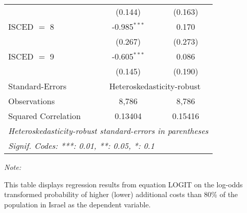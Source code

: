 \begin{table}[htbp!]
\begin{adjustbox}{width = 1\textwidth, max height = 0.95\textheight, center}
\begin{threeparttable}[b]
\begin{tabular}{lcc}
                                 & (0.144)        & (0.163)\\   
            ISCED $=$ 8          & -0.985$^{***}$ & 0.170\\   
                                 & (0.267)        & (0.273)\\   
            ISCED $=$ 9          & -0.605$^{***}$ & 0.086\\   
                                 & (0.145)        & (0.190)\\   
            \midrule 
            Standard-Errors & \multicolumn{2}{c}{Heteroskedasticity-robust} \\ 
            Observations         & 8,786          & 8,786\\  
            Squared Correlation  & 0.13404        & 0.15416\\  
            \midrule \midrule
            \multicolumn{3}{l}{\emph{Heteroskedasticity-robust standard-errors in parentheses}}\\
            \multicolumn{3}{l}{\emph{Signif. Codes: ***: 0.01, **: 0.05, *: 0.1}}\\
         \end{tabular}
         
         \begin{tablenotes}\item \medskip \textit{Note:}
            \item This table displays regression results from equation LOGIT on the log-odds transformed probability of higher (lower) additional costs than 80\% of the population in Israel as the dependent variable. 
         \end{tablenotes}
      \end{threeparttable}
   \end{adjustbox}
\end{table}


